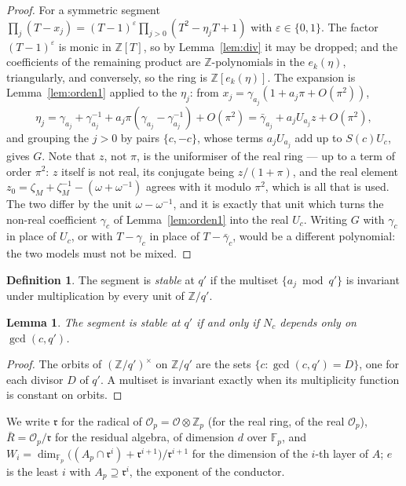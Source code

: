 \documentclass[11pt,a4paper]{article}
\newtheorem{lemma}[theorem]{Lemma}
\theoremstyle{definition}
\newtheorem{definition}[theorem]{Definition}
\newcommand{\ZZ}{\mathbb{Z}}
\newcommand{\FF}{\mathbb{F}}
\newcommand{\cO}{\mathcal{O}}
\newcommand{\rad}{\mathfrak{r}}
\begin{document}
\begin{proof}
For a symmetric segment $\prod_j(T-x_j)=(T-1)^{\varepsilon}\prod_{j>0}(T^2-\eta_jT+1)$ with
$\varepsilon\in\{0,1\}$. The factor $(T-1)^\varepsilon$ is monic in $\ZZ[T]$, so by
Lemma~\ref{lem:div} it may be dropped; and the coefficients of the remaining product are
$\ZZ$-polynomials in the $e_k(\eta)$, triangularly, and conversely, so the ring is
$\ZZ[e_k(\eta)]$. The expansion is Lemma~\ref{lem:orden1} applied to the $\eta_j$: from
$x_j=\gamma_{a_j}(1+a_j\pi+O(\pi^2))$,
\[
\eta_j=\gamma_{a_j}+\gamma_{a_j}^{-1}+a_j\pi(\gamma_{a_j}-\gamma_{a_j}^{-1})+O(\pi^2)
=\bar\gamma_{a_j}+a_jU_{a_j}z+O(\pi^2),
\]
and grouping the $j>0$ by pairs $\{c,-c\}$, whose terms $a_jU_{a_j}$ add up to $S(c)U_c$, gives
$G$. Note that $z$, not $\pi$, is the uniformiser of the real ring --- up to a term of order $\pi^2$:
$z$ itself is not real, its conjugate being $z/(1+\pi)$, and the real element
$z_0=\zeta_M+\zeta_M^{-1}-(\omega+\omega^{-1})$ agrees with it modulo $\pi^2$, which is all that
is used. The two differ by the unit $\omega-\omega^{-1}$, and it is exactly that unit which turns the
non-real coefficient $\gamma_c$ of Lemma~\ref{lem:orden1} into the real $U_c$. Writing $G$ with
$\gamma_c$ in place of $U_c$, or with $T-\gamma_c$ in place of $T-\bar\gamma_c$, would be a
different polynomial: the two models must not be mixed.
\end{proof}

\begin{definition}\label{def:est}
The segment is \emph{stable} at $q'$ if the multiset $\{a_j\bmod q'\}$ is invariant under
multiplication by every unit of $\ZZ/q'$.
\end{definition}

\begin{lemma}\label{lem:est}
The segment is stable at $q'$ if and only if $N_c$ depends only on $\gcd(c,q')$.
\end{lemma}

\begin{proof}
The orbits of $(\ZZ/q')^\times$ on $\ZZ/q'$ are the sets $\{c:\gcd(c,q')=D\}$, one for each divisor
$D$ of $q'$. A multiset is invariant exactly when its multiplicity function is constant on orbits.
\end{proof}

We write $\rad$ for the radical of $\cO_p=\cO\otimes\ZZ_p$ (for the real ring, of the real
$\cO_p$), $\bar R=\cO_p/\rad$ for the residual algebra, of dimension $d$ over $\FF_p$, and
$W_i=\dim_{\FF_p}\bigl((A_p\cap\rad^i)+\rad^{i+1}\bigr)/\rad^{i+1}$ for the dimension of the
$i$-th layer of $A$; $e$ is the least $i$ with $A_p\supseteq\rad^i$, the exponent of the
conductor.
\end{document}

